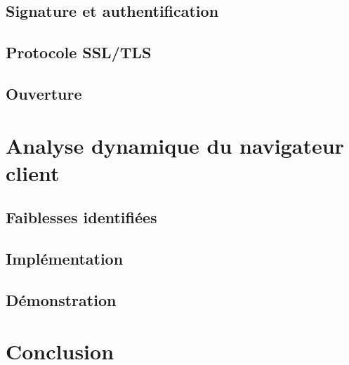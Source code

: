 \documentclass{beamer}
\begin{document}
\subsection{Signature et authentification}

\subsection{Protocole SSL/TLS}

\subsection{Ouverture}


\section{Analyse dynamique du navigateur client}
\subsection{Faiblesses identifiées}

\subsection{Implémentation}

\subsection{Démonstration}

\section{Conclusion}
\end{document}
